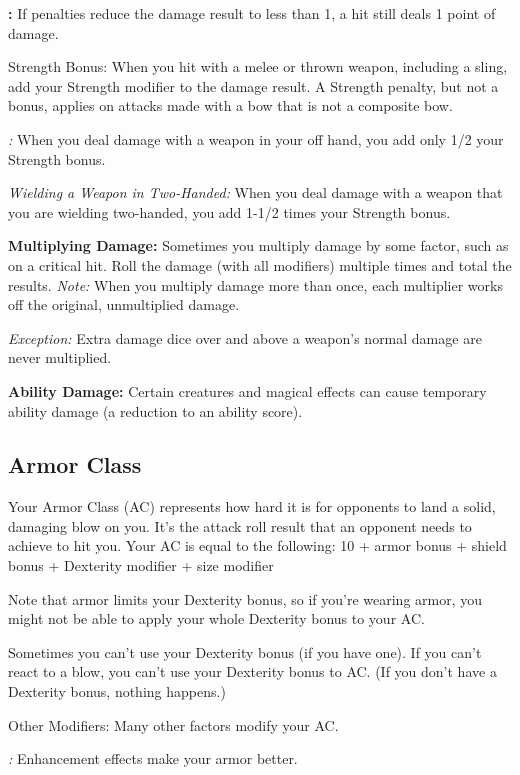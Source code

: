 \textbf{:} If penalties reduce the damage result to less than 1, a hit still deals 1 point of damage.

Strength Bonus: When you hit with a melee or thrown weapon, including a sling, add your Strength modifier to the damage result. A Strength penalty, but not a bonus, applies on attacks made with a bow that is not a composite bow.

\textit{:} When you deal damage with a weapon in your off hand, you add only 1/2 your Strength bonus.

\textit{Wielding a Weapon in Two-Handed:} When you deal damage with a weapon that you are wielding two-handed, you add 1-1/2 times your Strength bonus.

\textbf{Multiplying Damage:} Sometimes you multiply damage by some factor, such as on a critical hit. Roll the damage (with all modifiers) multiple times and total the results. \textit{Note:} When you multiply damage more than once, each multiplier works off the original, unmultiplied damage.

\textit{Exception:} Extra damage dice over and above a weapon's normal damage are never multiplied.

\textbf{Ability Damage:} Certain creatures and magical effects can cause temporary ability damage (a reduction to an ability score).

\subsection{Armor Class}

Your Armor Class (AC) represents how hard it is for opponents to land a solid, damaging blow on you. It's the attack roll result that an opponent needs to achieve to hit you. Your AC is equal to the following: 10 + armor bonus + shield bonus + Dexterity modifier + size modifier

Note that armor limits your Dexterity bonus, so if you're wearing armor, you might not be able to apply your whole Dexterity bonus to your AC.

Sometimes you can't use your Dexterity bonus (if you have one). If you can't react to a blow, you can't use your Dexterity bonus to AC. (If you don't have a Dexterity bonus, nothing happens.)

Other Modifiers: Many other factors modify your AC.

\textit{:} Enhancement effects make your armor better.

